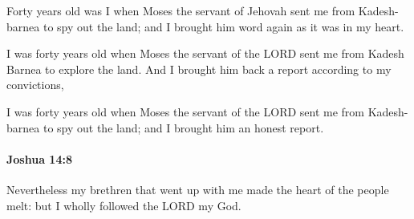 			\begin{versebox}
					\item[BHS] 
					\item[ASV] Forty years old was I when Moses the servant of Jehovah sent me from Kadesh-barnea to spy out the land; and I brought him word again as it was in my heart.
					\item[NIV] I was forty years old when Moses the servant of the LORD sent me from Kadesh Barnea to explore the land. And I brought him back a report according to my convictions,
					\item[NRSV] I was forty years old when Moses the servant of the LORD sent me from Kadesh-barnea to spy out the land; and I brought him an honest report.
			\end{versebox}

		\paragraph{Joshua 14:8} %
			\label{JOSHUA-14-8}

			Nevertheless my brethren that went up with me made the heart of the people melt: but I wholly followed the LORD my God.

